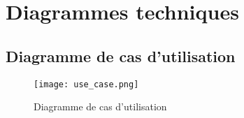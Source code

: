 \documentclass[10pt,a4paper]{article}
\begin{document}
\section{Diagrammes techniques}

\subsection{Diagramme de cas d'utilisation}

\begin{figure}[H]
\centering
\texttt{[image: use\_case.png]}
\label{use_case}
\caption{Diagramme de cas d'utilisation}
\end{figure}
\end{document}
